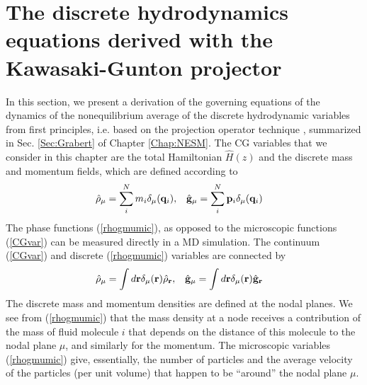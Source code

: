 \documentclass[b5paper,openright,10pt]{book}
\begin{document}
\section{The  discrete hydrodynamics equations derived
with the Kawasaki-Gunton projector}
\label{Sec:derivation}
In this section, we present a derivation of the governing equations of
the  dynamics   of  the   nonequilibrium  average  of   the  discrete
hydrodynamic  variables  from first  principles,  i.e.   based on  the
projection operator  technique \cite{Grabert1982}, summarized  in Sec.
\ref{Sec:Grabert} of Chapter \ref{Chap:NESM}.   The CG variables that we
consider in this chapter are the  total Hamiltonian $\hat{H}(z)$
and the discrete mass and momentum fields, which are defined according to
\begin{align}
  \hat{\rho}_\mu&= \sum_i^Nm_i\delta_\mu({\bf q}_i), &
\hat{\bf g}_\mu&= \sum_i^N{\bf p}_i\delta_\mu({\bf q}_i)
\label{rhogmumic}
\end{align}
The  phase  functions (\ref{rhogmumic}),  as  opposed  to  the  microscopic  functions
(\ref{CGvar}) can be  measured directly in a  MD simulation. The
continuum (\ref{CGvar}) and discrete (\ref{rhogmumic}) variables
are connected by
\begin{align}
  \hat{\rho}_\mu&= \int d{\bf r}\delta_\mu({\bf r})\hat{\rho}_{\bf r},&
  \hat{\bf g}_\mu&=\int d{\bf r}\delta_\mu({\bf r})\hat{\bf g}_{\bf r}
\label{rhogmumiccont}
\end{align}
The  discrete mass  and momentum  densities are  defined at  the nodal
planes. We see from (\ref{rhogmumic}) that  the mass density at a node
receives a contribution of the mass of fluid molecule $i$ that depends
on  the distance  of  this  molecule to  the  nodal  plane $\mu$,  and
similarly    for   the    momentum.     The   microscopic    variables
(\ref{rhogmumic}) give,  essentially, the number of  particles and the
average velocity of the particles (per  unit volume) that happen to be
``around'' the nodal plane $\mu$.
\end{document}
